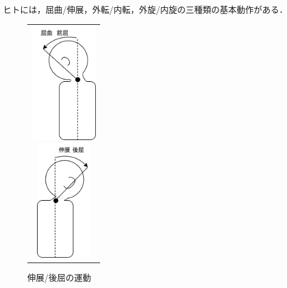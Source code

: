 ヒトには，屈曲/伸展，外転/内転，外旋/内旋の三種類の基本動作がある．
\begin{figure}
    \begin{center}
        \begin{tabular}{c}
            \begin{minipage}{0.5\hsize}
                \begin{center}
                    \includegraphics[height=5cm]{./images/forward_bending.png}
                    \caption{屈曲/前屈の運動}
                \end{center}
            \end{minipage}

            \begin{minipage}{0.5\hsize}
                \begin{center}
                    \includegraphics[height=5cm]{./images/backbend.png}
                    \caption{伸展/後屈の運動}
                \end{center}
            \end{minipage}
        \end{tabular}
    \end{center}
\end{figure}


